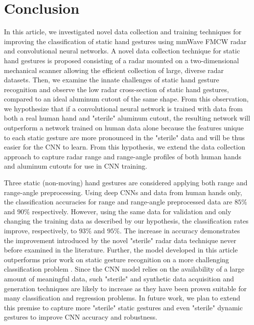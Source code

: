 \documentclass{ieeeaccess}
\begin{document}
\section{Conclusion}
\label{sec:conclusion}
In this article, we investigated novel data collection and training techniques for improving the classification of static hand gestures using mmWave FMCW radar and convolutional neural networks. A novel data collection technique for static hand gestures is proposed consisting of a radar mounted on a two-dimensional mechanical scanner allowing the efficient collection of large, diverse radar datasets. Then, we examine the innate challenges of static hand gesture recognition and observe the low radar cross-section of static hand gestures, compared to an ideal aluminum cutout of the same shape. From this observation, we hypothesize that if a convolutional neural network is trained with data from both a real human hand and "sterile" aluminum cutout, the resulting network will outperform a network trained on human data alone because the features unique to each static gesture are more pronounced in the "sterile" data and will be thus easier for the CNN to learn. From this hypothesis, we extend the data collection approach to capture radar range and range-angle profiles of both human hands and aluminum cutouts for use in CNN training.

Three static (non-moving) hand gestures are considered applying both range and range-angle preprocessing. Using deep CNNs and data from human hands only, the classification accuracies for range and range-angle preprocessed data are $85\%$ and $90\%$ respectively. However, using the same data for validation and only changing the training data as described by our hypothesis, the classification rates improve, respectively, to $93\%$ and $95\%$. The increase in accuracy demonstrates the improvement introduced by the novel "sterile" radar data technique never before examined in the literature. Further, the model developed in this article outperforms prior work on static gesture recognition on a more challenging classification problem \cite{static_gesture_recognition:time_domain}. Since the CNN model relies on the availability of a large amount of meaningful data, such "sterile" and synthetic data acquisition and generation techniques are likely to increase as they have been proven suitable for many classification and regression problems. In future work, we plan to extend this premise to capture more "sterile" static gestures and even "sterile" dynamic gestures to improve CNN accuracy and robustness.
\end{document}
